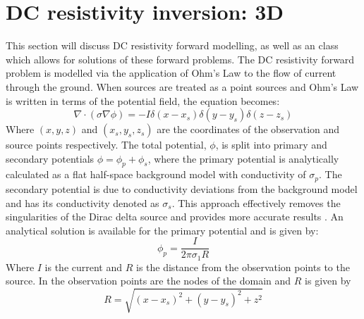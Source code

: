 %
%
%

\section{DC resistivity inversion: 3D}\label{sec:forward DCRES}
This section will discuss DC resistivity forward modelling, as well as an \escript
class which allows for solutions of these forward problems. The DC resistivity 
forward problem is modelled via the application of Ohm's Law to the flow of current
through the ground. When sources are treated as a point sources and Ohm's Law 
is written in terms of the potential field, the equation becomes:
\begin{equation} \label{ref:dcres:eq1}
\nabla \cdot (\sigma \nabla \phi) = -I \delta(x-x_s) \delta(y-y_s) \delta(z-z_s)
\end{equation}
Where $(x,y,z)$ and $(x_s, y_s, z_s)$ are the coordinates of the observation and source
points respectively. The total potential, $\phi$, is split into primary and secondary 
potentials $\phi = \phi_p + \phi_s$, where the primary potential is analytically calculated 
as a flat half-space background model with conductivity of $\sigma_p$. 
The secondary potential is due to conductivity deviations 
from the background model and has its conductivity denoted as $\sigma_s$. 
This approach effectively removes the singularities of the Dirac delta 
source and provides more accurate results \cite{rucker2006three}.
An analytical solution is available for the primary potential and is given by:
\begin{equation} \label{ref:dcres:eq2}
\phi_p = \frac{I}{2 \pi \sigma_1 R}
\end{equation}
Where $I$ is the current and $R$ is the distance from the observation points to the source.
In \escript the observation points are the nodes of the domain and $R$ is given by
\begin{equation} \label{ref:dcres:eq3}
R = \sqrt{(x-x_s)^2+(y-y_s)^2 + z^2}
\end{equation}
